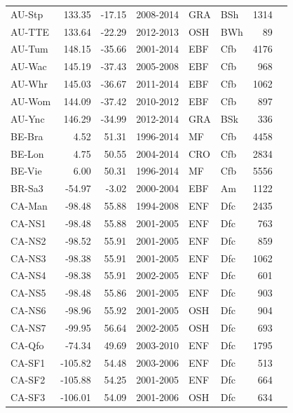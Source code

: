 \documentclass{myreport}
\begin{document}
\begin{longtable}{lrrlllrl}
 AU-Stp & 133.35 & -17.15 & 2008-2014 & GRA & BSh & 1314 & \cite{AU-Stp} \\ 
 AU-TTE & 133.64 & -22.29 & 2012-2013 & OSH & BWh &  89 & \cite{AU-TTE} \\ 
 AU-Tum & 148.15 & -35.66 & 2001-2014 & EBF & Cfb & 4176 & \cite{AU-Tum} \\ 
 AU-Wac & 145.19 & -37.43 & 2005-2008 & EBF & Cfb & 968 & \cite{AU-Wac} \\ 
 AU-Whr & 145.03 & -36.67 & 2011-2014 & EBF & Cfb & 1062 & \cite{AU-Whr} \\ 
 AU-Wom & 144.09 & -37.42 & 2010-2012 & EBF & Cfb & 897 & \cite{AU-Wom} \\ 
 AU-Ync & 146.29 & -34.99 & 2012-2014 & GRA & BSk & 336 & \cite{AU-Ync} \\ 
 BE-Bra & 4.52 & 51.31 & 1996-2014 & MF & Cfb & 4458 & \cite{BE-Bra} \\ 
 BE-Lon & 4.75 & 50.55 & 2004-2014 & CRO & Cfb & 2834 & \cite{BE-Lon} \\ 
 BE-Vie & 6.00 & 50.31 & 1996-2014 & MF & Cfb & 5556 & \cite{BE-Vie} \\ 
 BR-Sa3 & -54.97 & -3.02 & 2000-2004 & EBF & Am & 1122 & \cite{BR-Sa3} \\ 
 CA-Man & -98.48 & 55.88 & 1994-2008 & ENF & Dfc & 2435 & \cite{CA-Man} \\ 
 CA-NS1 & -98.48 & 55.88 & 2001-2005 & ENF & Dfc & 763 & \cite{CA-NS1} \\ 
 CA-NS2 & -98.52 & 55.91 & 2001-2005 & ENF & Dfc & 859 & \cite{CA-NS2} \\ 
 CA-NS3 & -98.38 & 55.91 & 2001-2005 & ENF & Dfc & 1062 & \cite{CA-NS3} \\ 
 CA-NS4 & -98.38 & 55.91 & 2002-2005 & ENF & Dfc & 601 & \cite{CA-NS4} \\ 
 CA-NS5 & -98.48 & 55.86 & 2001-2005 & ENF & Dfc & 903 & \cite{CA-NS5} \\ 
 CA-NS6 & -98.96 & 55.92 & 2001-2005 & OSH & Dfc & 904 & \cite{CA-NS6} \\ 
 CA-NS7 & -99.95 & 56.64 & 2002-2005 & OSH & Dfc & 693 & \cite{CA-NS7} \\ 
 CA-Qfo & -74.34 & 49.69 & 2003-2010 & ENF & Dfc & 1795 & \cite{CA-Qfo} \\ 
 CA-SF1 & -105.82 & 54.48 & 2003-2006 & ENF & Dfc & 513 & \cite{CA-SF1} \\ 
 CA-SF2 & -105.88 & 54.25 & 2001-2005 & ENF & Dfc & 664 & \cite{CA-SF2} \\ 
 CA-SF3 & -106.01 & 54.09 & 2001-2006 & OSH & Dfc & 634 & \cite{CA-SF3} \\ 

\end{longtable}
\end{document}
